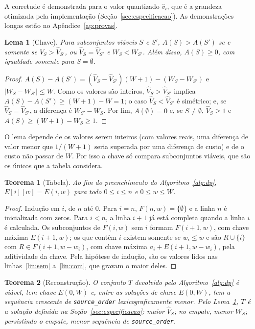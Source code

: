 \documentclass[11pt,a4paper]{article}
\theoremstyle{plain}
\newtheorem{lema}{Lema}
\newtheorem{teorema}{Teorema}
\theoremstyle{definition}
\theoremstyle{plain}
\begin{document}
A corretude é demonstrada para o valor quantizado $\hat{v}_i$, que é a grandeza otimizada
pela implementação (Seção~\ref{sec:especificacao}). As demonstrações longas estão no
Apêndice~\ref{ap:provas}.

\begin{lema}[Chave]
\label{lem:chave}
Para subconjuntos viáveis $S$ e $S'$, $A(S)>A(S')$ se e somente se
$\hat{V}_S>\hat{V}_{S'}$, ou $\hat{V}_S=\hat{V}_{S'}$ e $W_S<W_{S'}$. Além disso,
$A(S)\ge 0$, com igualdade somente para $S=\emptyset$.
\end{lema}

\begin{proof}
$A(S)-A(S')=(\hat{V}_S-\hat{V}_{S'})(W+1)-(W_S-W_{S'})$ e $|W_S-W_{S'}|\le W$. Como os
valores são inteiros, $\hat{V}_S>\hat{V}_{S'}$ implica $A(S)-A(S')\ge (W+1)-W=1$; o caso
$\hat{V}_S<\hat{V}_{S'}$ é simétrico; e, se $\hat{V}_S=\hat{V}_{S'}$, a diferença é
$W_{S'}-W_S$. Por fim, $A(\emptyset)=0$ e, se $S\ne\emptyset$, $\hat{V}_S\ge 1$ e
$A(S)\ge (W+1)-W_S\ge 1$.
\end{proof}

O lema depende de os valores serem inteiros (com valores reais, uma diferença de valor
menor que $1/(W+1)$ seria superada por uma diferença de custo) e de o custo não passar de
$W$. Por isso a chave só compara subconjuntos viáveis, que são os únicos que a tabela
considera.

\begin{teorema}[Tabela]
\label{teo:tabela}
Ao fim do preenchimento do Algoritmo~\ref{alg:dp}, $E[i][w]=E(i,w)$ para todo
$0\le i\le n$ e $0\le w\le W$.
\end{teorema}

\begin{proof}
Indução em $i$, de $n$ até $0$. Para $i=n$, $F(n,w)=\{\emptyset\}$ e a linha $n$ é
inicializada com zeros. Para $i<n$, a linha $i+1$ já está completa quando a linha $i$ é
calculada. Os subconjuntos de $F(i,w)$ sem $i$ formam $F(i+1,w)$, com chave máxima
$E(i+1,w)$; os que contêm $i$ existem somente se $w_i\le w$ e são $R\cup\{i\}$ com
$R\in F(i+1,w-w_i)$, com chave máxima $a_i+E(i+1,w-w_i)$, pela aditividade da chave. Pela
hipótese de indução, são os valores lidos nas linhas~\ref{lin:sem} a~\ref{lin:com}, que
gravam o maior deles.
\end{proof}

\begin{teorema}[Reconstrução]
\label{teo:reconstrucao}
O conjunto $T$ devolvido pelo Algoritmo~\ref{alg:dp} é viável, tem chave $E(0,W)$ e,
entre as soluções de chave $E(0,W)$, tem a sequência crescente de \texttt{source\_order}
lexicograficamente menor. Pelo Lema~\ref{lem:chave}, $T$ é a solução definida na
Seção~\ref{sec:especificacao}: maior $\hat{V}_S$; no empate, menor $W_S$; persistindo o
empate, menor sequência de \texttt{source\_order}.
\end{teorema}
\end{document}
